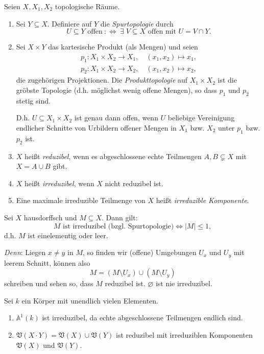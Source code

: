 \documentclass[a4paper,12pt]{scrbook}
\def\A{\mathbb{A}}
\def\V{\mathfrak{V}}
\newcommand{\leer}{\ensuremath{\varnothing}}
\newcommand{\card}[1]{|#1|}
\renewcommand{\mapsto}{\longmapsto}
\begin{document}
\begin{de}\label{1.2.6} Seien $X,X_{1},X_{2}$ topologische Räume.
\begin{enumerate}
\item Sei $Y\subseteq X$. Definiere auf $Y$ die \emph{Spurtopologie} durch
\[U\subseteq Y\text{ offen}\: :\Longleftrightarrow\:\exists\;V\subseteq X\text{ offen mit }U=V\cap Y.\]
\item Sei $X\times Y$ das kartesische Produkt (als Mengen) und seien
\begin{align*}p_{1}\colon X_{1}\times X_{2}\rightarrow X_{1},\quad(x_{1},x_{2})\mapsto x_{1},\\p_{2}\colon X_{1}\times X_{2}\rightarrow X_{2},\quad(x_{1},x_{2})\mapsto x_{2},\end{align*}
die zugehörigen Projektionen. Die \emph{Produkttopologie} auf $X_{1}\times X_{2}$ ist die gröbste Topologie (d.h. möglichst wenig offene Mengen), so dass $p_{1}$ und $p_{2}$ stetig sind.

D.h. $U\subseteq X_{1}\times X_{2}$ ist genau dann offen, wenn $U$ beliebige Vereinigung endlicher Schnitte von Urbildern offener Mengen in $X_{1}$ bzw. $X_{2}$ unter $p_{1}$ bzw. $p_{2}$ ist.

\item $X$ heißt \emph{reduzibel}, wenn es abgeschlossene echte Teilmengen $A,B\subsetneq X$ mit $X=A\cup B$ gibt.

\item $X$ heißt \emph{irreduzibel}, wenn $X$ nicht reduzibel ist.

\item Eine maximale irreduzible Teilmenge von $X$ heißt \emph{irreduzible Komponente}.
\end{enumerate}\end{de}

\begin{bsp}\label{1.2.7}
Sei $X$ hausdorffsch und $M\subseteq X$. Dann gilt:
\[M\text{ ist irreduzibel (bzgl. Spurtopologie)}\iff \card{M}\leq 1,\]
d.h. $M$ ist einelementig oder leer.

\emph{Denn}: Liegen $x\neq y$ in $M$, so finden wir (offene) Umgebungen $U_{x}$ und $U_{y}$ mit leerem Schnitt, können also
\[M=(M\setminus U_{x})\cup(M\setminus U_{y})\]
schreiben und sehen so, dass $M$ reduzibel ist. $\leer$ ist nie irreduzibel.
\end{bsp}

\begin{bsp}\label{1.2.8} Sei $k$ ein Körper mit unendlich vielen Elementen.
\begin{enumerate}
\item{} $\A^{1}(k)$ ist irreduzibel, da echte abgeschlossene Teilmengen endlich sind.
\item\label{1.2.8b} $\V(X\cdot Y) = \V(X)\cup\V(Y)$ ist reduzibel mit irreduziblen Komponenten $\V(X)$ und $\V(Y)$.
\end{enumerate}\end{bsp}
\end{document}
